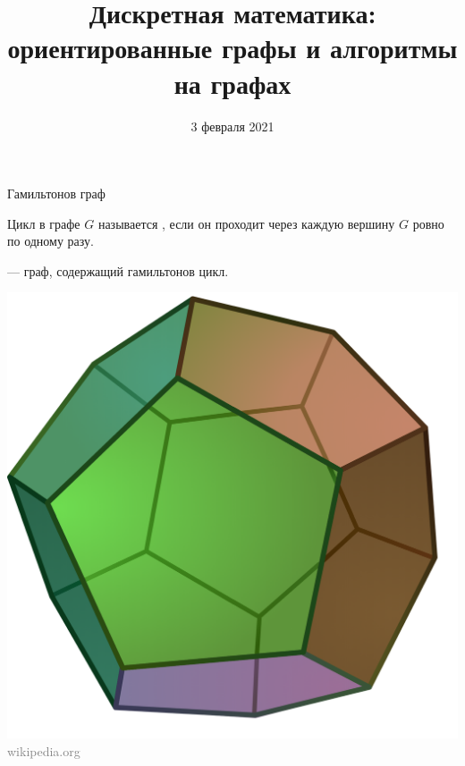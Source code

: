 
\usepackage{graphicx}

\date{3 февраля 2021}		%
\setcounter{s}{4}			%




\title{Дискретная математика:\\
ориентированные графы и алгоритмы на графах}


\begin{frame}
  \titlepage
\end{frame}

\begin{frame}{Гамильтонов граф}

 Цикл в графе $G$ называется , если он проходит через каждую вершину $G$ ровно по одному разу.

 {} — граф, содержащий гамильтонов цикл.

\begin{center}
\includegraphics[scale=0.2]{img/dodecahedron.png} \textcolor{Gray}{\tiny wikipedia.org}
\end{center}



\end{frame}

